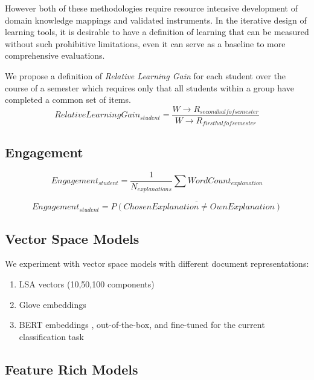 \documentclass[sigconf]{acmart}
\begin{document}
However both of these methodologies 
require resource intensive 
development of 
domain knowledge mappings and validated 
instruments. 
In the iterative design of learning 
tools, it is desirable to 
have a definition 
of learning that can be measured without 
such prohibitive 
limitations, even it 
can serve as a baseline to more 
comprehensive evaluations.

We propose a definition of 
\textit{Relative 
	Learning Gain} for each student over 
the course of a semester 
which requires 
only that all students within a group 
have completed a common 
set of items.
\begin{equation}
Relative Learning Gain_{student} = 
\frac{W \rightarrow R_{second 
		half of semester} }{W \rightarrow 
	R_{first half of 
		semester} }
\end{equation}


\subsection{Engagement}

\begin{equation}
Engagement_{student} = 
\frac{1}{N_{explanations}}\sum{WordCount_{explanation}}
\end{equation}



\begin{equation}
Engagement_{student} = 
\overline{P(ChosenExplanation \ne 
	OwnExplanation)} 
\label{eq:engagement_choose_peer}
\end{equation}


\subsection{Vector Space Models}
We experiment with vector space models with 
different document representations:
\begin{enumerate}
	\item LSA vectors (10,50,100 components) 
	\cite{deerwester_indexing_1990}
	\item Glove embeddings 
	\cite{pennington_glove:_2014}
	\item BERT embeddings \cite{devlin_bert_2018}, 
	out-of-the-box, and 
	fine-tuned for the current classification task
\end{enumerate}


\subsection{Feature Rich Models}
\end{document}
